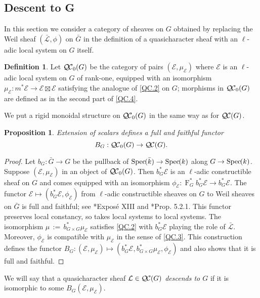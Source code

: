 \documentclass[CM,Submssn,SecEq]{degruyter-crelle} %
\theoremstyle{plain}
\newtheorem{proposition}[theorem]{Proposition}
\theoremstyle{definition}
\newtheorem{definition}[theorem]{Definition}
\theoremstyle{remark}
\newcommand{\bFq}{\bar{k}}
\newcommand{\Fq}{k}
\newcommand{\Frob}[1]{\operatorname{F}_{#1}}
\newcommand{\Spec}[1]{{\operatorname{Spec}\hskip-1pt( #1 )}}
\newcommand{\ceq}{{\, :=\, }}
\newcommand{\qcs}[1]{{\mathcal{#1}}}
\newcommand{\gqcs}[1]{{\mathcal{\bar #1}}}
\newcommand{\QC}{{\mathcal{Q\hskip-0.8pt C}}}
\newcommand{\bQC}{{\QC_0}}
\newcommand{\bG}{\bar{G}}
\begin{document}
\subsection{Descent to G}\label{ssec:descentG}

In this section we consider a category of sheaves on $G$ obtained by
replacing the Weil sheaf $(\gqcs{L}, \phi)$ on $\bG$ in the definition of a quasicharacter sheaf with an $\ell$-adic local system on $G$ itself.

\begin{definition}
Let $\bQC(G)$ be the category of pairs $(\qcs{E},\mu_\qcs{E})$
where $\qcs{E}$ is an $\ell$-adic local system on $G$ of rank-one,
equipped with an isomorphism $\mu_\qcs{E} : m^* \qcs{E} \to \qcs{E} \boxtimes \qcs{E}$
satisfying the analogue of \ref{QC.2} on $G$;
morphisms in $\bQC(G)$ are defined as in the second part of
\ref{QC.4}.
\end{definition}

We put a rigid monoidal structure on $\bQC(G)$ in the same way as for $\QC(G)$.

\begin{proposition}\label{prop:BG}
Extension of scalars defines a full and faithful functor
\[
B_G : \bQC(G) \to \QC(G).
\]
\end{proposition}

\begin{proof}
 Let $b_G : {\bar G} \to G$ be the pullback of $\Spec{\bFq} \to \Spec{\Fq}$ along $G\to \Spec{\Fq}$.
 Suppose $(\qcs{E},\mu_\qcs{E})$ in an object of $\bQC(G)$.
 Then $b_G^* \qcs{E}$ is an $\ell$-adic constructible sheaf on $G$ and
 comes equipped with an isomorphism
 $\phi_\qcs{E} : \Frob{G}^* b_G^*\qcs{E} \to b_G^* \qcs{E}$.
 The functor $\qcs{E} \mapsto (b_G^* \qcs{E},\phi_\qcs{E})$
 from $\ell$-adic constructible sheaves on $G$ to Weil sheaves on $\bG$
 is full and faithful; see \cite{deligne-katz:SGA7.2}*{Expos\'e XIII} and \cite{beilinson-bernstein-deligne:81a}*{Prop. 5.2.1}.
 This functor preserves local constancy, so takes local systems to local systems.
 The isomorphism $\mu \ceq b_{G\times G}^*\mu_\qcs{E}$ satisfies \ref{QC.2}
 with $b_G^*\qcs{E}$ playing the role of $\gqcs{L}$.
 Moreover, $\phi_\qcs{E}$ is compatible with $\mu_\qcs{E}$ in the sense of \ref{QC.3}.
 This construction defines the functor $B_G : (\qcs{E},\mu_\qcs{E}) \mapsto (b_G^*\qcs{E},b_{G\times G}^*\mu_\qcs{E}, \phi_\qcs{E})$
 and also shows that it is full and faithful.
\end{proof}

We will say that a quasicharacter sheaf $\qcs{L} \in \QC(G)$ \emph{descends to $G$} if it is isomorphic to some $B_G(\qcs{E}, \mu_\qcs{E})$.
\end{document}
